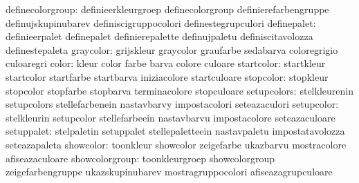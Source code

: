                definecolorgroup:  definieerkleurgroep              definecolorgroup
                                  definierefarbengruppe            definujskupinubarev
                                  definiscigruppocolori            definestegrupculori
                    definepalet:  definieerpalet                   definepalet
                                  definierepalette                 definujpaletu
                                  definiscitavolozza               definestepaleta
                      graycolor:  grijskleur                       graycolor
                                  graufarbe                        sedabarva
                                  coloregrigio                     culoaregri
                          color:  kleur                            color
                                  farbe                            barva
                                  colore                           culoare
                     startcolor:  startkleur                       startcolor
                                  startfarbe                       startbarva
                                  iniziacolore                     startculoare
                      stopcolor:  stopkleur                        stopcolor
                                  stopfarbe                        stopbarva
                                  terminacolore                    stopculoare
                    setupcolors:  stelkleurenin                    setupcolors
                                  stellefarbenein                  nastavbarvy
                                  impostacolori                    seteazaculori
                     setupcolor:  stelkleurin                      setupcolor
                                  stellefarbeein                   nastavbarvu
                                  impostacolore                    seteazaculoare
                     setuppalet:  stelpaletin                      setuppalet
                                  stellepaletteein                 nastavpaletu
                                  impostatavolozza                 seteazapaleta
                      showcolor:  toonkleur                        showcolor
                                  zeigefarbe                       ukazbarvu
                                  mostracolore                     afiseazaculoare
                 showcolorgroup:  toonkleurgroep                   showcolorgroup
                                  zeigefarbengruppe                ukazskupinubarev
                                  mostragruppocolori               afiseazagrupculoare
